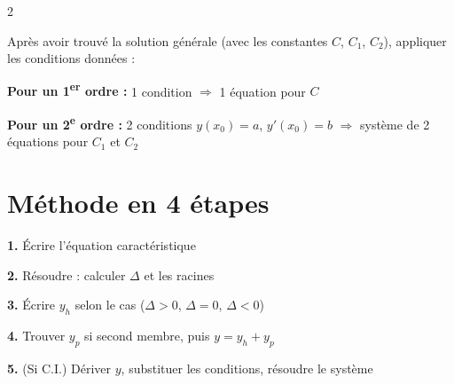 \documentclass[10pt,a4paper]{article}
\begin{document}
\begin{multicols}{2}
\begin{grisbox}
Après avoir trouvé la solution générale (avec les constantes $C$, $C_1$, $C_2$), appliquer les conditions données :

\textbf{Pour un 1\textsuperscript{er} ordre :} 1 condition $\Rightarrow$ 1 équation pour $C$

\textbf{Pour un 2\textsuperscript{e} ordre :} 2 conditions $y(x_0)=a$, $y'(x_0)=b$
$\Rightarrow$ système de 2 équations pour $C_1$ et $C_2$
\end{grisbox}

\section{Méthode en 4 étapes}

\begin{grisbox}
\textbf{1.} Écrire l'équation caractéristique

\textbf{2.} Résoudre : calculer $\Delta$ et les racines

\textbf{3.} Écrire $y_h$ selon le cas ($\Delta>0$, $\Delta=0$, $\Delta<0$)

\textbf{4.} Trouver $y_p$ si second membre, puis $y = y_h + y_p$

\textbf{5.} (Si C.I.) Dériver $y$, substituer les conditions, résoudre le système
\end{grisbox}

\end{multicols}
\end{document}
